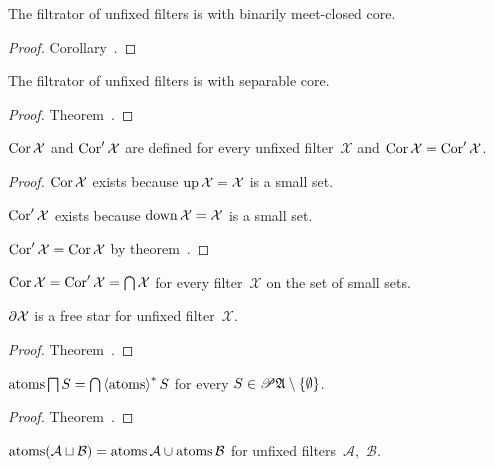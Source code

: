 \begin{prop}
The filtrator of unfixed filters is with binarily meet-closed core.
\end{prop}

\begin{proof}
Corollary~.
\end{proof}

\begin{prop}
The filtrator of unfixed filters is with separable core.
\end{prop}

\begin{proof}
Theorem~.
\end{proof}

\begin{prop}
$\operatorname{Cor}\mathcal{X}$ and $\operatorname{Cor}'\mathcal{X}$ are defined for every
unfixed filter~$\mathcal{X}$ and
$\operatorname{Cor}\mathcal{X}=\operatorname{Cor}'\mathcal{X}$.
\end{prop}

\begin{proof}
$\operatorname{Cor}\mathcal{X}$ exists because
$\operatorname{up}\mathcal{X}=\mathcal{X}$ is a small set.

$\operatorname{Cor}'\mathcal{X}$ exists because
$\operatorname{down}\mathcal{X}=\mathcal{X}$ is a small set.

$\operatorname{Cor}'\mathcal{X}=\operatorname{Cor}\mathcal{X}$ by
theorem~.
\end{proof}

\begin{obvious}
$\operatorname{Cor}\mathcal{X}=\operatorname{Cor}'\mathcal{X}=\bigcap\mathcal{X}$ for
every filter~$\mathcal{X}$ on the set of small sets.
\end{obvious}

\begin{prop}
$\partial\mathcal{X}$ is a free star for unfixed
filter~$\mathcal{X}$.
\end{prop}

\begin{proof}
Theorem~.
\end{proof}

\begin{prop}
$\operatorname{atoms}\bigsqcap S=\bigcap\left\langle \operatorname{atoms}\right\rangle ^{\ast}S$ for every $S\in\mathscr{P}\mathfrak{A}\setminus\{\emptyset\}$.
\end{prop}

\begin{proof}
Theorem~.
\end{proof}

\begin{prop}
$\operatorname{atoms}(\mathcal{A}\sqcup\mathcal{B})=\operatorname{atoms}\mathcal{A}\cup\operatorname{atoms}\mathcal{B}$ for unfixed
filters~$\mathcal{A}$,~$\mathcal{B}$.
\end{prop}

